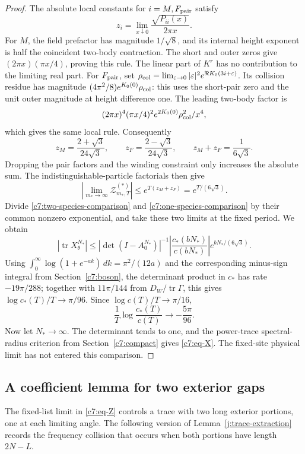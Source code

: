 \begin{proof}
The absolute local constants for $i=M,F_{\rm pair}$ satisfy
\[
 z_i=\lim_{x\downarrow0}\frac{\sqrt{P_{ii}(x)}}{2\pi x}.
\]
For $M$, the field prefactor has magnitude $1/\sqrt8$, and its internal
height exponent is half the coincident two-body contraction. The short
and outer zeros give $(2\pi x)(\pi x/4)$, proving this rule. The linear
part of $K^r$ has no contribution to the limiting real part. For
$F_{\rm pair}$, set
$\rho_{\rm col}=\lim_{\varepsilon\to0}|\varepsilon|^2
 e^{\Re K_0(3i+\varepsilon)}$. Its collision residue has magnitude
$(4\pi^2/8)e^{K_0(0)}\rho_{\rm col}$: this uses the short-pair zero and
the unit outer magnitude at height difference one. The leading
two-body factor is
\[
 (2\pi x)^4(\pi x/4)^2e^{2K_0(0)}\rho_{\rm col}^2/x^4,
\]
which gives the same local rule. Consequently
\[
 z_M=\frac{2+\sqrt3}{24\sqrt3},\qquad
 z_F=\frac{2-\sqrt3}{24\sqrt3},\qquad
 z_M+z_F=\frac1{6\sqrt3}.
\]
Dropping the pair factors and the winding constraint only increases
the absolute sum. The indistinguishable-particle factorials then give
\[
 \left|\lim_{m_*\to\infty}\mathcal Z^{(*)}_{m_*,T}\right|
 \le e^{T(z_M+z_F)}=e^{T/(6\sqrt3)}.
\]
Divide \eqref{c7:two-species-comparison} and
\eqref{c7:one-species-comparison} by their common nonzero exponential,
and take these two limits at the fixed period. We obtain
\[
 |\operatorname{tr}X_\theta^{N_*}|
 \le |\det(I-A_0^{N_*})|^{-1}
      \left|\frac{c_*(bN_*)}{c(bN_*)}\right|
      e^{bN_*/(6\sqrt3)}.
\]
Using $\int_0^\infty\log(1+e^{-ak})\,dk=\pi^2/(12a)$ and the
corresponding minus-sign integral from Section~\ref{c7:boson}, the
determinant product in $c_*$ has rate $-19\pi/288$; together with
$11\pi/144$ from $D_W/\operatorname{tr}\Gamma$, this gives
$\log c_*(T)/T\to\pi/96$. Since $\log c(T)/T\to\pi/16$,
\[
 \frac1T\log\frac{c_*(T)}{c(T)}\longrightarrow-\frac{5\pi}{96}.
\]
Now let $N_*\to\infty$. The determinant tends to one, and the
power-trace spectral-radius criterion from Section~\ref{c7:compact}
gives \eqref{c7:eq-X}. The fixed-site physical limit has not entered
this comparison.
\end{proof}

\subsection{A coefficient lemma for two exterior gaps}

The fixed-list limit in \eqref{c7:eq-Z} controls a trace with two long
exterior portions, one at each limiting angle. The following version
of Lemma~\ref{j:trace-extraction} records the frequency collision that
occurs when both portions have length $2N-L$.

